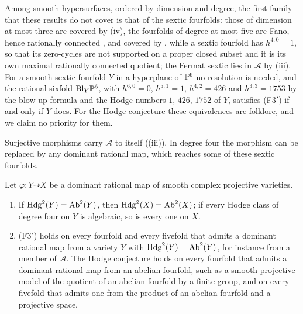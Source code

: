\begin{remark}
Among smooth hypersurfaces, ordered by dimension and degree, the first
family that these results do not cover is that of the sextic fourfolds:
those of dimension at most three are covered by (iv),
the fourfolds of degree at most five are Fano, hence rationally connected
\cite{Cam92,KMM92}, and covered by , while a sextic
fourfold has $h^{4,0}=1$, so that its zero-cycles are not supported on a
proper closed subset and it is its own maximal rationally connected
quotient; the Fermat sextic lies in $\mathcal{A}$ by
(iii). For a smooth sextic fourfold $Y$ in a
hyperplane of $\mathbb{P}^{6}$ no resolution is needed, and the rational sixfold
$\mathrm{Bl}_{Y}\mathbb{P}^{6}$, with $h^{6,0}=0$, $h^{5,1}=1$, $h^{4,2}=426$ and
$h^{3,3}=1753$ by the blow-up formula \cite[\S7.3.3]{Voi02} and the Hodge
numbers $1$, $426$, $1752$ of $Y$, satisfies \textup{(F3$'$)} if and only if
$Y$ does. For the Hodge
conjecture these equivalences are folklore, and we claim no priority for
them.
\end{remark}

Surjective morphisms carry $\mathcal{A}$ to itself ((iii)).
In degree four the morphism can be replaced by any dominant rational map,
which reaches some of these sextic fourfolds.

\begin{proposition}
\label{prop:f3primedominant}
Let $\varphi\colon Y\dashrightarrow X$ be a dominant rational map of smooth
complex projective varieties.
\begin{enumerate}[label=\textup{(\roman*)},leftmargin=2.6em,itemsep=2pt]
\item If $\mathrm{Hdg}^{2}(Y)=\mathrm{Ab}^{2}(Y)$, then
  $\mathrm{Hdg}^{2}(X)=\mathrm{Ab}^{2}(X)$; if every Hodge class of degree four on
  $Y$ is algebraic, so is every one on $X$.
\item \textup{(F3$'$)} holds on every fourfold and every fivefold that
  admits a dominant rational map from a variety $Y$ with
  $\mathrm{Hdg}^{2}(Y)=\mathrm{Ab}^{2}(Y)$, for instance from a member of
  $\mathcal{A}$. The Hodge conjecture holds on every fourfold that admits a
  dominant rational map from an abelian fourfold, such as a smooth
  projective model of the quotient of an abelian fourfold by a finite group,
  and on every fivefold that admits one from the product of an abelian
  fourfold and a projective space.
\end{enumerate}
\end{proposition}

